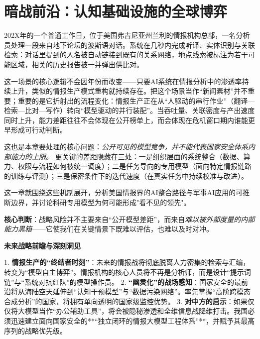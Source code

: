 \chapter{暗战前沿：认知基础设施的全球博弈}

202X年的一个普通工作日，位于美国弗吉尼亚州兰利的情报机构总部，一名分析员处理一段来自地下论坛的波斯语对话。系统在几秒内完成听译、实体识别与关联检索：对话里提到的人名被自动链接到既有的关系网络，地点线索被标注为若干可能区域，相关的历史报告被一并弹出供比对。

这一场景的核心逻辑不会因年份而改变——只要AI系统在情报分析中的渗透率持续上升，类似的情报生产模式重构就持续存在。把这个场景当作“新闻素材”并不重要；重要的是它折射出的流程变化：情报生产正在从“人驱动的串行作业”（翻译—检索—比对—写作）转向“模型驱动的并行装配”。当吞吐量、关联密度与产出速度同时上升，能力差距往往不会体现在公开榜单上，而会体现在危机窗口期内谁能更早形成可行动判断。

这也是本章要处理的核心问题：\emph{公开可见的模型竞争，并不能代表国家安全体系内部能力的上限。} 更关键的差距隐藏在三处：一是组织层面的系统整合（数据、算力、权限与流程如何被统一调度）；二是任务导向的专用模型（面向特定情报链路的训练与评测）；三是保密条件下的迭代速度（在真实任务中持续校准与改进）。

这一章就围绕这些机制展开，分析美国情报界的AI整合路径与军事AI应用的可推断边界，并讨论科研专用模型为何可能形成"看不见的领先"。

            {\bfseries 核心判断}：战略风险并不主要来自“公开模型差距”，而来自\emph{难以被外部度量的内部能力黑箱}——它使我们在关键情景下既难以评估，也难以及时对冲。

\vspace{0.5em}
    \begin{mdframed}[backgroundcolor=gray!10, leftline=true, linewidth=2pt, linecolor=black]
    \textbf{未来战略前瞻与深刻洞见}
    
    1. \textbf{情报生产的“终结者时刻”}：未来的情报战将彻底脱离人力密集的检索与汇编，转变为“模型自主博弈”。情报机构的核心人员将不再是分析师，而是设计“提示词链”与“系统对抗红队”的模型操作员。
    2. \textbf{“幽灵化”的战场感知}：国家安全的最前沿将从海陆空天延伸到“认知干预模型”与“数据污染网络”。率先掌握“高阶跨模态合成分析”的国家，将拥有单向透明的国家级监控优势。
    3. \textbf{对中方的启示}：如果仅仅将大模型当作“办公辅助工具”，将会被隐秘渗透和全维信息战降维打击。我国必须迅速建立面向国家安全的**“独立闭环的情报大模型工程体系”**，并赋予其最高序列的战略优先级。
    \end{mdframed}
\vspace{0.5em}

